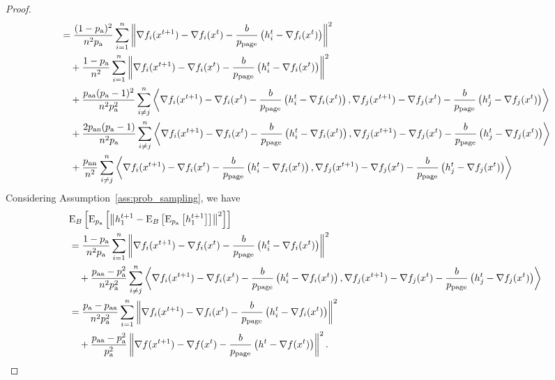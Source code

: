 \documentclass{article}
\begin{document}
\begin{proof}
\begin{align*}
    &=\frac{(1 - p_{\textnormal{a}})^2}{n^2 p_{\textnormal{a}}}\sum_{i=1}^n\left\| \nabla f_i(x^{t+1}) - \nabla f_i(x^{t}) - \frac{b}{p_{\text{page}}} \left(h^t_i - \nabla f_i(x^{t})\right) \right\|^2 \\
    &\quad + \frac{1 - p_{\textnormal{a}}}{n^2}\sum_{i=1}^n\left\| \nabla f_i(x^{t+1}) - \nabla f_i(x^{t}) - \frac{b}{p_{\text{page}}} \left(h^t_i - \nabla f_i(x^{t})\right) \right\|^2\\
    &\quad +\frac{p_{\textnormal{aa}}(p_{\textnormal{a}} - 1)^2}{n^2 p_{\textnormal{a}}^2}\sum_{i\neq j}^n\left\langle\nabla f_i(x^{t+1}) - \nabla f_i(x^{t}) - \frac{b}{p_{\text{page}}} \left(h^t_i - \nabla f_i(x^{t})\right),\nabla f_j(x^{t+1}) - \nabla f_j(x^{t}) - \frac{b}{p_{\text{page}}} \left(h^t_j - \nabla f_j(x^{t})\right)\right\rangle \\
    &\quad +\frac{2p_{\textnormal{an}} (p_{\textnormal{a}} - 1)}{n^2 p_{\textnormal{a}}}\sum_{i\neq j}^n\left\langle\nabla f_i(x^{t+1}) - \nabla f_i(x^{t}) - \frac{b}{p_{\text{page}}} \left(h^t_i - \nabla f_i(x^{t})\right),\nabla f_j(x^{t+1}) - \nabla f_j(x^{t}) - \frac{b}{p_{\text{page}}} \left(h^t_j - \nabla f_j(x^{t})\right)\right\rangle \\
    &\quad +\frac{p_{\textnormal{nn}}}{n^2}\sum_{i\neq j}^n\left\langle\nabla f_i(x^{t+1}) - \nabla f_i(x^{t}) - \frac{b}{p_{\text{page}}} \left(h^t_i - \nabla f_i(x^{t})\right),\nabla f_j(x^{t+1}) - \nabla f_j(x^{t}) - \frac{b}{p_{\text{page}}} \left(h^t_j - \nabla f_j(x^{t})\right)\right\rangle \\
  \end{align*}
  Considering Assumption~\ref{ass:prob_sampling}, we have
  \begin{align*}
    &\ExpSub{B}{\ExpSub{\probavailable}{\norm{h^{t+1}_{1} - \ExpSub{B}{\ExpSub{\probavailable}{h^{t+1}_{1}}}}^2}}\\
    &=\frac{1 - \probavailable}{n^2 \probavailable}\sum_{i=1}^n\norm{\nabla f_i(x^{t+1}) - \nabla f_i(x^{t}) - \frac{b}{\probpage} \left(h^t_i - \nabla f_i(x^{t})\right)}^2 \\
    &\quad +\frac{\probpairaa - \probavailable^2}{n^2 \probavailable^2}\sum_{i\neq j}^n\inp{\nabla f_i(x^{t+1}) - \nabla f_i(x^{t}) - \frac{b}{\probpage} \left(h^t_i - \nabla f_i(x^{t})\right)}{\nabla f_j(x^{t+1}) - \nabla f_j(x^{t}) - \frac{b}{\probpage} \left(h^t_j - \nabla f_j(x^{t})\right)} \\
    &=\frac{\probavailable - \probpairaa}{n^2 \probavailable^2}\sum_{i=1}^n\norm{\nabla f_i(x^{t+1}) - \nabla f_i(x^{t}) - \frac{b}{\probpage} \left(h^t_i - \nabla f_i(x^{t})\right)}^2 \\
    &\quad +\frac{\probpairaa - \probavailable^2}{\probavailable^2}\norm{\nabla f(x^{t+1}) - \nabla f(x^{t}) - \frac{b}{\probpage} \left(h^t - \nabla f(x^{t})\right)}^2. \\

\end{align*}
\end{proof}
\end{document}
